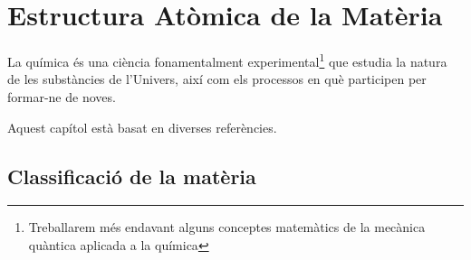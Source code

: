 \chapter{Estructura Atòmica de la Matèria}
La química és una ciència fonamentalment experimental\footnote{Treballarem més endavant alguns conceptes matemàtics de la mecànica quàntica aplicada a la química} que estudia la natura de les substàncies de l'Univers, així com els processos en què participen per formar-ne de noves.

Aquest capítol està basat en diverses referències.\cite{Caamano1984,Mahan1977,Yen2008}

\section{Classificació de la matèria}

